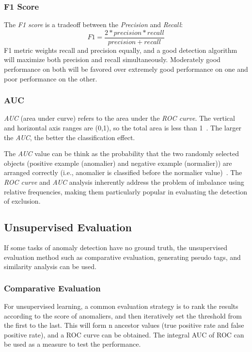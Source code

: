 \subsubsection{F1 Score}
The \textit{F1 score} is a tradeoff between
the \textit{Precision} and \textit{Recall}:
\begin{equation}
  F1=\frac{2*precision*recall}{precision+recall}
\end{equation}
F1 metric weights recall and
precision equally,
and a good detection algorithm will
maximize both precision and
recall simultaneously.
Moderately good performance on
both will be favored over
extremely good performance on
one and poor performance on the other.

\subsubsection{AUC}
\textit{AUC} (area under curve) refers to the area under the \textit{ROC curve}.
The vertical and horizontal axis ranges are (0,1),
so the total area is less than 1~\cite{bradley1997use}.
The larger the \textit{AUC},
the better the classification effect.

The \textit{AUC} value can be think as the probability that
the two randomly selected objects (positive example (anomalier)
and negative example (normalier)) are arranged correctly
(i.e.,
anomalier is classified before the normalier value)~\cite{hanley1982meaning}.
The \textit{ROC curve} and \textit{AUC}
analysis inherently address the problem of imbalance using
relative frequencies,
making them particularly popular in evaluating
the detection of exclusion.

\subsection{Unsupervised Evaluation}
If some tasks of anomaly detection  
have no ground truth,
the unsupervised evaluation method
such as comparative evaluation,
generating pseudo tags,
and similarity analysis can be used.

\subsubsection{Comparative Evaluation}

For unsupervised learning,
a common evaluation strategy is to rank the
results according to the score of anomaliers,
and then iteratively set the threshold from
the first to the last.
This will form n ancestor values
(true positive rate and false positive rate),
and a ROC curve can be obtained.
The integral AUC of ROC can be used as a measure
to test the performance.


